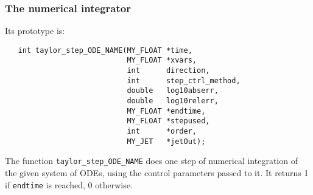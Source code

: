 \documentclass[10pt]{article}
\theoremstyle{remark}
\begin{document}
\subsubsection*{The numerical integrator}\label{sec:tnu}
Its prototype is:
\begin{verbatim}
   int taylor_step_ODE_NAME(MY_FLOAT *time,
                            MY_FLOAT *xvars,
                            int      direction,
                            int      step_ctrl_method,
                            double   log10abserr,
                            double   log10relerr,
                            MY_FLOAT *endtime,
                            MY_FLOAT *stepused,
                            int      *order,
                            MY_JET   *jetOut);
\end{verbatim}
The function \verb+taylor_step_ODE_NAME+ does one step of numerical
integration of the given system of ODEs, using the control parameters
passed to it. It returns 1 if \verb+endtime+ is reached, 0 otherwise.

\bigskip
\end{document}
